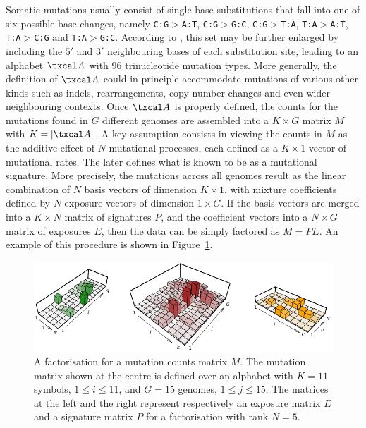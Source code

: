 \documentclass{bioinfo}
\begin{document}
Somatic mutations usually consist of single base substitutions that
fall into one of six possible base changes, namely
\texttt{C:G}$>$\texttt{A:T}, \texttt{C:G}$>$\texttt{G:C},
\texttt{C:G}$>$\texttt{T:A}, \texttt{T:A}$>$\texttt{A:T},
\texttt{T:A}$>$\texttt{C:G} and \texttt{T:A}$>$\texttt{G:C}. According
to \cite{A}, this set may be further enlarged by including the $5'$
and $3'$ neighbouring bases of each substitution site, leading to an 
alphabet $\txcal A$ with 96 trinucleotide mutation types. More
generally, the definition of $\txcal A$ could in principle accommodate
mutations of various other kinds such as indels, rearrangements, copy
number changes and even wider neighbouring contexts. Once $\txcal A$
is properly defined, the counts for the mutations found in $G$
different genomes are assembled into a $K\times G$ matrix $M$ with $K
= |\txcal A|$. A key assumption consists in viewing the counts in $M$
as the additive effect of $N$ mutational processes, each defined as a
$K\times 1$ vector of mutational rates. The later defines what
is known to be as a mutational signature. More precisely, the
mutations across all genomes result as the linear combination of $N$
basis vectors of dimension $K\times 1$, with mixture coefficients
defined by $N$ exposure vectors of dimension $1 \times G$. If the
basis vectors are merged into a $K\times N$ matrix of signatures $P$,
and the coefficient vectors into a $N\times G$ matrix of exposures
$E$, then the data can be simply factored as $M=PE$. An example of
this procedure is shown in Figure~\ref{fig:toyNMF}.

\begin{figure}
 \centering\includegraphics[width=15cm]{figs/f}
 \caption{\textrm{%
  A factorisation for a mutation counts matrix $M$. The
  mutation matrix shown at the centre is defined over an alphabet with
  $K=11$ symbols, $1 \leqslant i \leqslant 11$, and $G=15$ genomes,
  $1\leqslant j\leqslant 15$. The matrices at the left and the right 
  represent respectively an exposure  matrix $E$ and a signature matrix
  $P$ for a factorisation with rank $N=5$.
  }
 }
\label{fig:toyNMF}
\end{figure}
\end{document}

